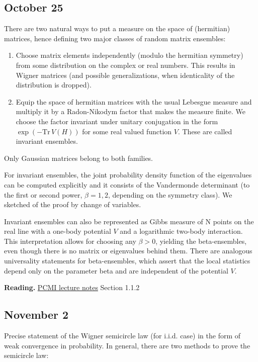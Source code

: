 \documentclass[a4paper]{article}
\begin{document}
\subsection{October 25%
  \label{october-25}%
}

There are two natural ways to put a measure on the space of (hermitian) matrices, hence defining two major classes of random matrix ensembles:

\begin{enumerate}
\item Choose matrix elements independently (modulo the hermitian symmetry) from some distribution on the complex or real numbers. This results in Wigner matrices (and possible generalizations, when identicality of the distribution is dropped).

\item Equip the space of hermitian matrices with the usual Lebesgue measure and multiply it by a Radon-Nikodym factor that makes the measure finite. We choose the factor invariant under unitary conjugation in the form $\exp(-\text{Tr}\, V(H))$ for some real valued function $V$. These are called invariant ensembles.
\end{enumerate}

Only Gaussian matrices belong to both families.

For invariant ensembles, the joint probability density function of the eigenvalues can be computed explicitly and it consists of the Vandermonde determinant (to the first or second power, $\beta=1,2$, depending on the symmetry class). We sketched of the proof by change of variables.

Invariant ensembles can also be represented as Gibbs measure of N points on the real line with a one-body potential $V$ and a logarithmic two-body interaction. This interpretation allows for choosing any $\beta>0$, yielding the beta-ensembles, even though there is no matrix or eigenvalues behind them. There are analogous universality statements for beta-ensembles, which assert that the local statistics depend only on the parameter beta and are independent of the potential $V$.

\textbf{Reading.} \href{pcmi.pdf}{PCMI lecture notes} Section 1.1.2


\subsection{November 2%
  \label{november-2}%
}

Precise statement of the Wigner semicircle law (for i.i.d. case) in the form of weak convergence in probability. In general, there are two methods to prove the semicircle law:
\end{document}
